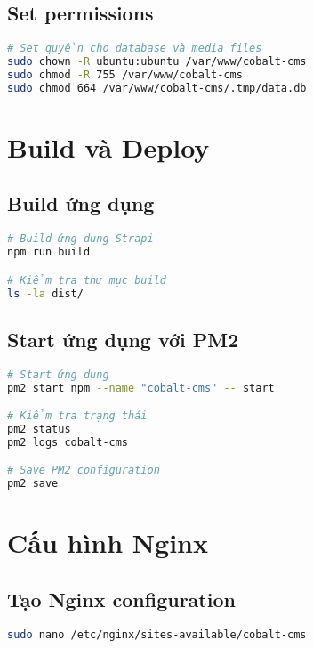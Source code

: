 \documentclass[12pt,a4paper]{article}
\begin{document}
\subsection{Set permissions}
\begin{lstlisting}[language=bash]
# Set quyền cho database và media files
sudo chown -R ubuntu:ubuntu /var/www/cobalt-cms
sudo chmod -R 755 /var/www/cobalt-cms
sudo chmod 664 /var/www/cobalt-cms/.tmp/data.db
\end{lstlisting}

\section{Build và Deploy}

\subsection{Build ứng dụng}
\begin{lstlisting}[language=bash]
# Build ứng dụng Strapi
npm run build

# Kiểm tra thư mục build
ls -la dist/
\end{lstlisting}

\subsection{Start ứng dụng với PM2}
\begin{lstlisting}[language=bash]
# Start ứng dụng
pm2 start npm --name "cobalt-cms" -- start

# Kiểm tra trạng thái
pm2 status
pm2 logs cobalt-cms

# Save PM2 configuration
pm2 save
\end{lstlisting}

\section{Cấu hình Nginx}

\subsection{Tạo Nginx configuration}
\begin{lstlisting}[language=bash]
sudo nano /etc/nginx/sites-available/cobalt-cms
\end{lstlisting}
\end{document}
